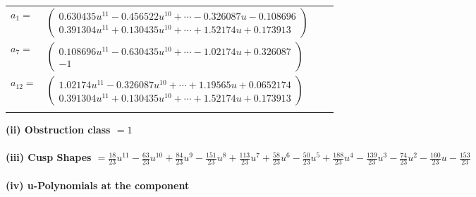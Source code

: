 \documentclass[1p]{elsarticle_modified}
\theoremstyle{definition}
\begin{document}
\begin{tabular}{m{7pt} m{180pt} m{7pt} m{180pt} }
\flushright $a_{1}=$&$\begin{pmatrix}0.630435 u^{11}-0.456522 u^{10}+\cdots-0.326087 u-0.108696\\0.391304 u^{11}+0.130435 u^{10}+\cdots+1.52174 u+0.173913\end{pmatrix}$ \\
\flushright $a_{7}=$&$\begin{pmatrix}0.108696 u^{11}-0.630435 u^{10}+\cdots-1.02174 u+0.326087\\-1\end{pmatrix}$ \\
\flushright $a_{12}=$&$\begin{pmatrix}1.02174 u^{11}-0.326087 u^{10}+\cdots+1.19565 u+0.0652174\\0.391304 u^{11}+0.130435 u^{10}+\cdots+1.52174 u+0.173913\end{pmatrix}$\\&\end{tabular}
\flushleft \textbf{(ii) Obstruction class $= 1$}\\~\\
\flushleft \textbf{(iii) Cusp Shapes $= \frac{18}{23} u^{11}-\frac{63}{23} u^{10}+\frac{84}{23} u^9-\frac{151}{23} u^8+\frac{113}{23} u^7+\frac{58}{23} u^6-\frac{50}{23} u^5+\frac{188}{23} u^4-\frac{139}{23} u^3-\frac{74}{23} u^2-\frac{160}{23} u-\frac{153}{23}$}\\~\\
\newpage\renewcommand{\arraystretch}{1}
\flushleft \textbf{(iv) u-Polynomials at the component}\newline \\
\end{document}
